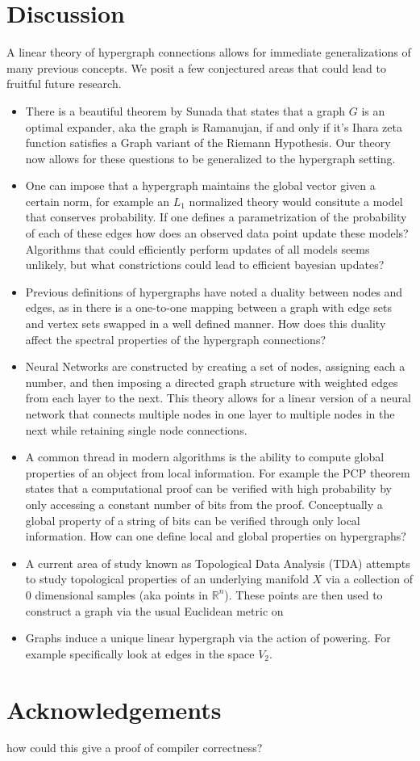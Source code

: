 \documentclass{article}
\begin{document}
\section{Discussion}
A linear theory of hypergraph connections allows for immediate generalizations of many previous concepts. We posit a few conjectured areas that could lead to fruitful future research.
\begin{itemize}
    \item There is a beautiful theorem by Sunada that states that a graph $G$ is an optimal expander, aka the graph is Ramanujan, if and only if it's Ihara zeta function satisfies a Graph variant of the Riemann Hypothesis. Our theory now allows for these questions to be generalized to the hypergraph setting.
    \item One can impose that a hypergraph maintains the global vector given a certain norm, for example an $L_1$ normalized theory would consitute a model that conserves probability. If one defines a parametrization of the probability of each of these edges how does an observed data point update these models? Algorithms that could efficiently perform updates of all models seems unlikely, but what constrictions could lead to efficient bayesian updates?
    \item Previous definitions of hypergraphs have noted a duality between nodes and edges, as in there is a one-to-one mapping between a graph with edge sets and vertex sets swapped in a well defined manner. How does this duality affect the spectral properties of the hypergraph connections?
    \item Neural Networks are constructed by creating a set of nodes, assigning each a number, and then imposing a directed graph structure with weighted edges from each layer to the next. This theory allows for a linear version of a neural network that connects multiple nodes in one layer to multiple nodes in the next while retaining single node connections.
    \item A common thread in modern algorithms is the ability to compute global properties of an object from local information. For example the PCP theorem states that a computational proof can be verified with high probability by only accessing a constant number of bits from the proof. Conceptually a global property of a string of bits can be verified through only local information. How can one define local and global properties on hypergraphs?
    \item  A current area of study known as Topological Data Analysis (TDA) attempts to study topological properties of an underlying manifold $X$ via a collection of 0 dimensional samples (aka points in $\mathbb{R}^n$). These points are then used to construct a graph via the usual Euclidean metric on
    \item Graphs induce a unique linear hypergraph via the action of powering. For example specifically look at edges in the space $V_2$.  
\end{itemize}

\section*{Acknowledgements}

how could this give a proof of compiler correctness?
\end{document}
